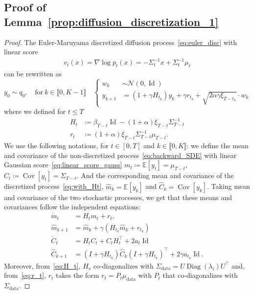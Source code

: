 \documentclass[11pt]{article}
\newcommand{\eqdef}{\coloneqq}
\newcommand{\id}{\operatorname{Id}}
\newcommand{\EE}{\mathbb{E}}
\newcommand{\cov}{\operatorname{Cov}}
\begin{document}
\subsection{Proof of Lemma~\ref{prop:diffusion_discretization_1}}
\label{app:diffusion_discretization_1}
\begin{proof}
The Euler-Maruyama discretized diffusion process~\eqref{eq:euler_disc} with linear score 
\begin{align} \label{eq:linear_score_gauss}
v_t(x) = \nabla \log p_t(x) = - \Sigma_t^{-1} x + \Sigma_t^{-1} \mu_t
\end{align}
can be rewritten as
\begin{equation*}
    y_0 \sim q_0, \quad  \text{for} \  k \in \llbracket 0, K-1 \rrbracket \quad 
    \left\{
    \begin{aligned}
        w_k &\sim \mathcal{N}(0, \id) \\
        y_{k+1} &= (1 + \gamma H_{t_k})y_k + \gamma r_{t_k}  + \sqrt{2 \alpha \gamma \xi_{T-t_k}} \cdot w_k
    \end{aligned}
    \right.
\end{equation*}
where we defined for $t \leq T$
\begin{align*} 
H_t &\eqdef \beta_{T-t}\id - (1 + \alpha) \xi_{T-t} \Sigma_{T-t}^{-1}\\
 r_t &\eqdef (1 + \alpha) \xi_{T-t} \Sigma_{T-t}^{-1} \mu_{T-t}.
\end{align*}
We use the following notations, for $t\in [0,T]$ and $k \in \llbracket 0, K \rrbracket$: we define the mean and covariance of the non-discretized process~\eqref{eq:backward_SDE} with linear Gaussian score~\eqref{eq:linear_score_gauss} $m_t \eqdef  \EE[y_t] = \mu_{T-t}$, $C_t \eqdef  \cov[y_t] = \Sigma_{T-t}$. And the corresponding mean and covariance of the discretized process~\eqref{eq:with_Ht}, $\hat m_k = \EE[y_k]$ and  $\hat C_k = \cov[y_k]$. Taking mean and covariance of the two stochastic processes, we get that these means and covariances follow the independent equations: 
  \begin{align*} 
    \dot m_t &= H_t m_t + r_t, \\
    \hat m_{k+1}
    &=
    \hat m_k+\gamma(H_{t_k}\hat m_k+r_{t_k}) \\
    \dot C_t &= H_t C_t + C_t H_t^\top + 2 a_t \id \\
    \hat C_{k+1}
    &=
    (I+\gamma H_{t_k}) \hat C_k(I+\gamma H_{t_k})^\top
    +2\gamma a_{t_k} \id.
  \end{align*}
    Moreover, from~\eqref{eq:H_t}, $H_s$ co-diagonalizes with $\Sigma_{\mathrm{data}} = U \operatorname{Diag}(\lambda_i) U^\top$ and, from~\eqref{eq:r_t},  $r_t$ takes the form $r_t = P_t \mu_{\mathrm{data}}$ with $P_t$ that co-diagonalizes with $\Sigma_{\mathrm{data}}$.

\end{proof}
\end{document}
